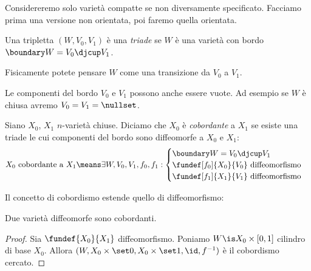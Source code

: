 

Considereremo solo varietà compatte se non diversamente specificato.
Facciamo prima una versione non orientata, poi faremo quella orientata.

\begin{defn}[Triade]
	Una tripletta $(W,V_0,V_1)$ è una \emph{triade} se $W$ è una varietà con bordo $\boundary W=V_0\djcup V_1$.
\end{defn}

Fisicamente potete pensare $W$ come una transizione da $V_0$ a $V_1$.

\begin{oss}
	Le componenti del bordo $V_0$ e $V_1$ possono anche essere vuote.
	Ad esempio se $W$ è chiusa avremo $V_0=V_1=\nullset$.
\end{oss}

\begin{defn}[Cobordismo]
	Siano $X_0$, $X_1$ $n$-varietà chiuse. Diciamo che $X_0$ è \emph{cobordante} a $X_1$ se esiste una triade le cui componenti del bordo sono diffeomorfe a $X_0$ e $X_1$:
	\[\text{$X_0$ cobordante a $X_1$}\means
	\exists W,V_0,V_1,f_0,f_1:\begin{cases}
		\boundary W=V_0\djcup V_1 \\
		\fundef[f_0]{X_0}{V_0}\text{ diffeomorfismo} \\
		\fundef[f_1]{X_1}{V_1}\text{ diffeomorfismo}
	\end{cases}\]
\end{defn}

\begin{center}
	
\end{center}

Il concetto di cobordismo estende quello di diffeomorfismo:

\begin{prop}
	\label{th:diffcob}
	Due varietà diffeomorfe sono cobordanti.
\end{prop}

\begin{proof}
	Sia $\fundef{X_0}{X_1}$ diffeomorfismo.
	Poniamo $W\is X_0\times[0,1]$ cilindro di base $X_0$.
	Allora $(W,X_0\times\set0,X_0\times\set1,\id,f^{-1})$ è il cobordismo cercato.
\end{proof}

\begin{center}
	
\end{center}
	
